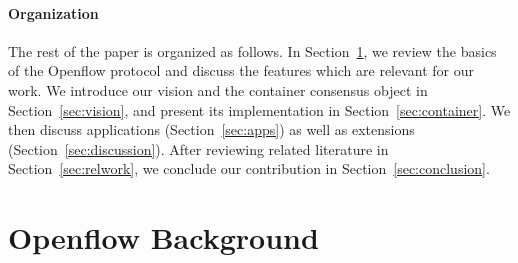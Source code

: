 \documentclass[conference]{sigcomm-alternate}
\begin{document}

\paragraph{Organization}
The rest of the paper is organized as follows.
In Section~\ref{sec:background}, we review the basics of the  Openflow
protocol and discuss the features which are relevant for our work.
We introduce our vision and the container consensus object in Section~\ref{sec:vision},
and present its implementation in Section~\ref{sec:container}.
We then discuss applications (Section~\ref{sec:apps}) as
well as extensions (Section~\ref{sec:discussion}).
After reviewing related literature in Section~\ref{sec:relwork}, we conclude
our contribution in Section~\ref{sec:conclusion}.


\section{Openflow Background}\label{sec:background}
\end{document}
